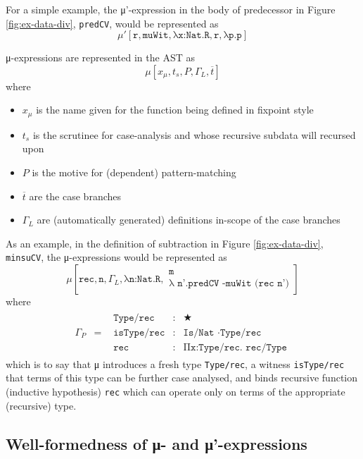 \documentclass{article}
\newcommand{\mupsche}[4]{μ'[#1,#2,#3,#4]}
\newcommand{\musche}[5]{μ[#1,#2,#3,#4,#5]}
\newcommand{\vars}[1]{{\overline{#1}}}
\begin{document}
For a simple example, the μ'-expression in the body of predecessor in Figure
\ref{fig:ex-data-div}, \texttt{predCV}, would be represented as
\[
  \mupsche{\texttt{r}}{\texttt{muWit}}{\texttt{λx:Nat.R}}{
    \texttt{r}, \texttt{λp.p}
  }
\]

μ-expressions are represented in the AST as
\[
  \musche{x_μ}{t_s}{P}{\Gamma_L}{\vars{t}}
\]
\noindent where
\begin{itemize}
\item $x_{μ}$ is the name given for the function being defined in fixpoint style
\item $t_s$ is the scrutinee for case-analysis and whose recursive subdata will
  recursed upon
\item $P$ is the motive for (dependent) pattern-matching
\item $\vars{t}$ are the case branches
\item $\Gamma_L$ are (automatically generated) definitions in-scope of the case
  branches
\end{itemize}

As an example, in the definition of subtraction in Figure
\ref{fig:ex-data-div}, \texttt{minsuCV}, the μ-expressions would be represented
as
\[
  \musche{\texttt{rec}}{\texttt{n}}{\Gamma_L}{\texttt{λn:Nat.R}}
  {\begin{array}{c}
     \texttt{m}
     \\ \texttt{λ n'.predCV -muWit (rec n')}
   \end{array}
    }
\]
\noindent where
\[
  \begin{array}{lcl}
    \Gamma_P
    & =
    & \begin{array}{lcl}
        \texttt{Type/rec} & : & ★
        \\ \texttt{isType/rec} & : & \texttt{Is/Nat ·Type/rec}
        \\ \texttt{rec} & : & \texttt{Πx:Type/rec. rec/Type}
      \end{array}
  \end{array}
\]
\noindent which is to say that μ introduces a fresh type \texttt{Type/rec}, a
witness \texttt{isType/rec} that terms of this type can be further case
analysed, and binds recursive function (inductive hypothesis) \texttt{rec} which
can operate only on terms of the appropriate (recursive) type.

\subsection{Well-formedness of μ- and μ'-expressions}
\end{document}
